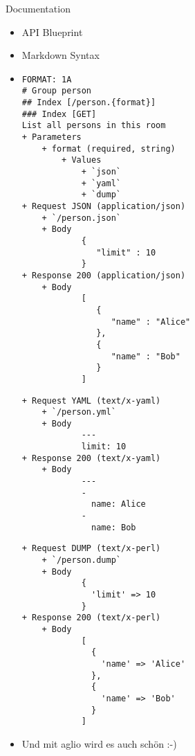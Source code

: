 \documentclass[aspectratio=1610]{beamer}
\begin{document}
\begin{frame}[fragile]{Documentation}

\begin{itemize}

\item API Blueprint\cite{apiblueprint}
\pause
\item Markdown Syntax
\pause

\item
{\tiny
\begin{multicols}{3}
\begin{verbatim}
FORMAT: 1A
# Group person
## Index [/person.{format}]
### Index [GET]
List all persons in this room
+ Parameters
    + format (required, string)
        + Values
            + `json`
            + `yaml`
            + `dump`
+ Request JSON (application/json)
    + `/person.json`
    + Body
            {
               "limit" : 10
            }
+ Response 200 (application/json)
    + Body
            [
               {
                  "name" : "Alice"
               },
               {
                  "name" : "Bob"
               }
            ]
\end{verbatim}\columnbreak\begin{verbatim}
+ Request YAML (text/x-yaml)
    + `/person.yml`
    + Body
            --- 
            limit: 10
+ Response 200 (text/x-yaml)
    + Body
            --- 
            - 
              name: Alice
            - 
              name: Bob
\end{verbatim}\columnbreak\begin{verbatim}
+ Request DUMP (text/x-perl)
    + `/person.dump`
    + Body
            {
              'limit' => 10
            }
+ Response 200 (text/x-perl)
    + Body
            [
              {
                'name' => 'Alice'
              },
              {
                'name' => 'Bob'
              }
            ]
\end{verbatim}
\end{multicols}
}

\pause
\item Und mit aglio\cite{aglio} wird es auch schön :-)
\end{itemize}

\end{frame}

\end{document}
